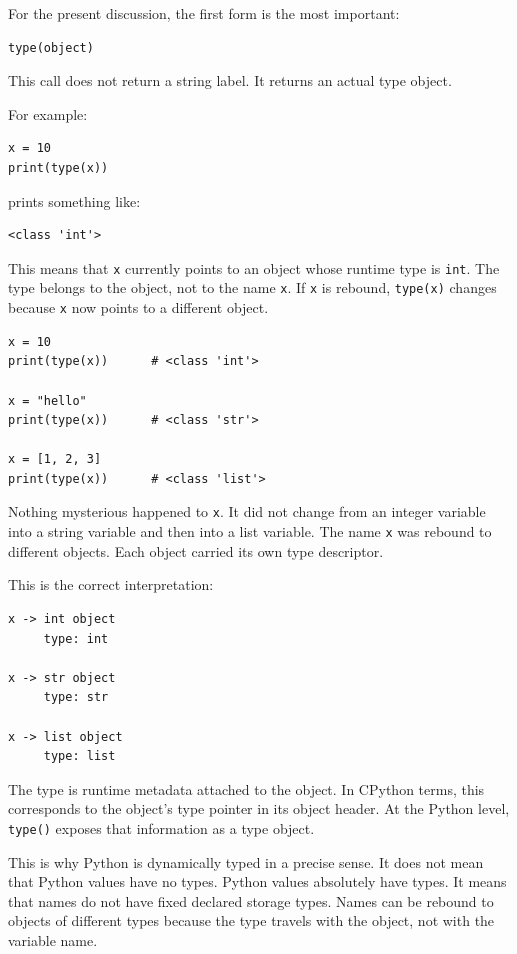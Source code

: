 For the present discussion, the first form is the most important:

\begin{verbatim}
type(object)
\end{verbatim}

This call does not return a string label. It returns an actual type object.

For example:

\begin{verbatim}
x = 10
print(type(x))
\end{verbatim}

prints something like:

\begin{verbatim}
<class 'int'>
\end{verbatim}

This means that \texttt{x} currently points to an object whose runtime type is \texttt{int}. The type belongs to the object, not to the name \texttt{x}. If \texttt{x} is rebound, \texttt{type(x)} changes because \texttt{x} now points to a different object.

\begin{verbatim}
x = 10
print(type(x))      # <class 'int'>

x = "hello"
print(type(x))      # <class 'str'>

x = [1, 2, 3]
print(type(x))      # <class 'list'>
\end{verbatim}

Nothing mysterious happened to \texttt{x}. It did not change from an integer variable into a string variable and then into a list variable. The name \texttt{x} was rebound to different objects. Each object carried its own type descriptor.

This is the correct interpretation:

\begin{verbatim}
x -> int object
     type: int

x -> str object
     type: str

x -> list object
     type: list
\end{verbatim}

The type is runtime metadata attached to the object. In CPython terms, this corresponds to the object's type pointer in its object header. At the Python level, \texttt{type()} exposes that information as a type object.

This is why Python is dynamically typed in a precise sense. It does not mean that Python values have no types. Python values absolutely have types. It means that names do not have fixed declared storage types. Names can be rebound to objects of different types because the type travels with the object, not with the variable name.

